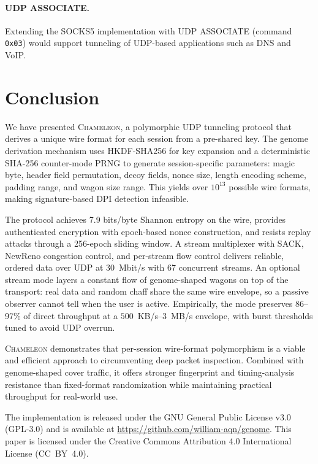 \documentclass[11pt,a4paper]{article}
\let\oldparagraph\paragraph
\renewcommand{\paragraph}[1]{\needspace{5\baselineskip}\oldparagraph{#1}}
\newcommand{\chameleon}{\textsc{Chameleon}}
\begin{document}
\paragraph{UDP ASSOCIATE.} Extending the SOCKS5 implementation with UDP ASSOCIATE (command \texttt{0x03}) would support tunneling of UDP-based applications such as DNS and VoIP.

\section{Conclusion}\label{sec:conclusion}

We have presented \chameleon{}, a polymorphic UDP tunneling protocol that derives a unique wire format for each session from a pre-shared key. The genome derivation mechanism uses HKDF-SHA256 for key expansion and a deterministic SHA-256 counter-mode PRNG to generate session-specific parameters: magic byte, header field permutation, decoy fields, nonce size, length encoding scheme, padding range, and wagon size range. This yields over $10^{13}$ possible wire formats, making signature-based DPI detection infeasible.

The protocol achieves 7.9 bits/byte Shannon entropy on the wire, provides authenticated encryption with epoch-based nonce construction, and resists replay attacks through a 256-epoch sliding window. A stream multiplexer with SACK, NewReno congestion control, and per-stream flow control delivers reliable, ordered data over UDP at 30~Mbit/s with 67 concurrent streams. An optional stream mode layers a constant flow of genome-shaped wagons on top of the transport: real data and random chaff share the same wire envelope, so a passive observer cannot tell when the user is active. Empirically, the mode preserves 86--97\% of direct throughput at a $500$~KB/s--$3$~MB/s envelope, with burst thresholds tuned to avoid UDP overrun.

\chameleon{} demonstrates that per-session wire-format polymorphism is a viable and efficient approach to circumventing deep packet inspection. Combined with genome-shaped cover traffic, it offers stronger fingerprint and timing-analysis resistance than fixed-format randomization while maintaining practical throughput for real-world use.

The implementation is released under the GNU General Public License v3.0 (GPL-3.0) and is available at \url{https://github.com/william-aqn/genome}. This paper is licensed under the Creative Commons Attribution 4.0 International License (CC~BY~4.0).



\end{document}
